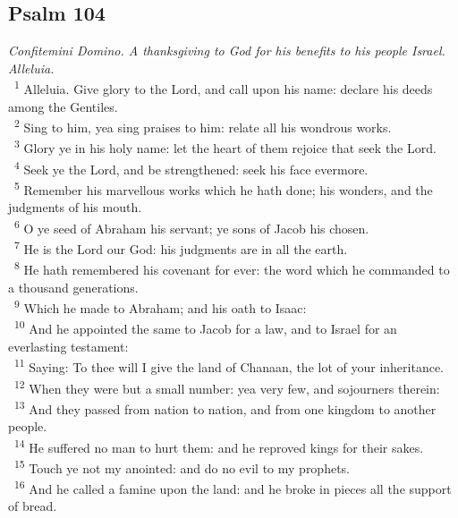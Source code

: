 \documentclass[a5paper,12pt]{article}
\begin{document}
\begin{multicols*}{2}
\section{Psalm 104}
\label{sec:orgeb4e3e3}
\emph{Confitemini Domino. A thanksgiving to God for his benefits to his people Israel. Alleluia.}\\

~\textsuperscript{1} Alleluia. Give glory to the Lord, and call upon his name: declare his deeds among the Gentiles.\\
~\textsuperscript{2} Sing to him, yea sing praises to him: relate all his wondrous works.\\
~\textsuperscript{3} Glory ye in his holy name: let the heart of them rejoice that seek the Lord.\\
~\textsuperscript{4} Seek ye the Lord, and be strengthened: seek his face evermore.\\
~\textsuperscript{5} Remember his marvellous works which he hath done; his wonders, and the judgments of his mouth.\\
~\textsuperscript{6} O ye seed of Abraham his servant; ye sons of Jacob his chosen.\\
~\textsuperscript{7} He is the Lord our God: his judgments are in all the earth.\\
~\textsuperscript{8} He hath remembered his covenant for ever: the word which he commanded to a thousand generations.\\
~\textsuperscript{9} Which he made to Abraham; and his oath to Isaac:\\
~\textsuperscript{10} And he appointed the same to Jacob for a law, and to Israel for an everlasting testament:\\
~\textsuperscript{11} Saying: To thee will I give the land of Chanaan, the lot of your inheritance.\\
~\textsuperscript{12} When they were but a small number: yea very few, and sojourners therein:\\
~\textsuperscript{13} And they passed from nation to nation, and from one kingdom to another people.\\
~\textsuperscript{14} He suffered no man to hurt them: and he reproved kings for their sakes.\\
~\textsuperscript{15} Touch ye not my anointed: and do no evil to my prophets.\\
~\textsuperscript{16} And he called a famine upon the land: and he broke in pieces all the support of bread.\\

\end{multicols*}
\end{document}
